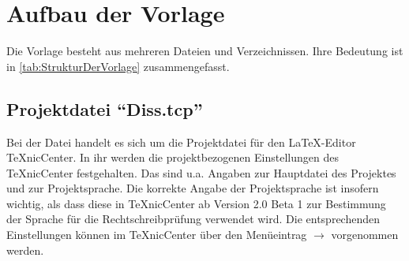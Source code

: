 \section{Aufbau der Vorlage}%
\label{sec:AufbauDerVorlage}
%
Die Vorlage besteht aus mehreren Dateien und Verzeichnissen.
Ihre Bedeutung ist in \cref{tab:StrukturDerVorlage} zusammengefasst.

{%
\footnotesize%
\renewcommand{\arraystretch}{2.0}%
\setlength{\tabcolsep}{0pt}%
%
}%


\subsection[Projektdatei \enquote{Diss.tcp}]{Projektdatei \enquote{Diss.tcp}}%
%
\label{sec:Projektdatei}
%
Bei der Datei  handelt es sich um die Projektdatei für den \LaTeX-Editor TeXnicCenter.
In ihr werden die projektbezogenen Einstellungen des TeXnicCenter festgehalten.
Das sind u.a. Angaben zur Hauptdatei des Projektes und zur Projektsprache.
Die korrekte Angabe der Projektsprache ist insofern wichtig, als dass diese in TeXnicCenter ab Version 2.0 Beta 1 zur Bestimmung der Sprache für die Rechtschreibprüfung verwendet wird.
Die entsprechenden Einstellungen können im TeXnicCenter über den Menüeintrag  $\rightarrow$  vorgenommen werden.


